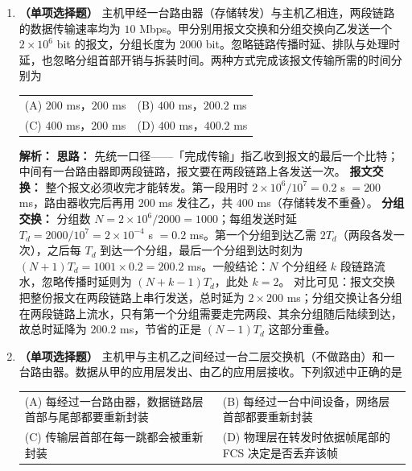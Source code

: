 \begin{enumerate}[start=7]

\item \textbf{（单项选择题）} 主机甲经一台路由器（存储转发）与主机乙相连，两段链路的数据传输速率均为 $10$ Mbps。甲分别用报文交换和分组交换向乙发送一个 $2\times10^{6}$ bit 的报文，分组长度为 $2000$ bit。忽略链路传播时延、排队与处理时延，也忽略分组首部开销与拆装时间。两种方式完成该报文传输所需的时间分别为
\begin{center}
\begin{tabular}{ll}
(A) $200$ ms，$200$ ms & (B) $400$ ms，$200.2$ ms \\[4pt]
(C) $400$ ms，$200$ ms & (D) $400$ ms，$400.2$ ms
\end{tabular}
\end{center}

\ifshowsolutions\par\noindent\textbf{解析：} \textbf{思路：} 先统一口径——「完成传输」指乙收到报文的最后一个比特；中间有一台路由器即两段链路，报文要在两段链路上各发送一次。
\textbf{报文交换：} 整个报文必须收完才能转发。第一段用时 $2\times10^{6}/10^{7}=0.2$ s $=200$ ms，路由器收完后再用 $200$ ms 发往乙，共 $400$ ms（存储转发不重叠）。
\textbf{分组交换：} 分组数 $N=2\times10^{6}/2000=1000$；每组发送时延 $T_d=2000/10^{7}=2\times10^{-4}$ s $=0.2$ ms。第一个分组到达乙需 $2T_d$（两段各发一次），之后每 $T_d$ 到达一个分组，最后一个分组到达时刻为 $(N+1)T_d=1001\times0.2=200.2$ ms。一般结论：$N$ 个分组经 $k$ 段链路流水，忽略传播时延则为 $(N+k-1)T_d$，此处 $k=2$。
对比可见：报文交换把整份报文在两段链路上串行发送，总时延为 $2\times200$ ms；分组交换让各分组在两段链路上流水，只有第一个分组需要走完两段、其余分组随后陆续到达，故总时延降为 $200.2$ ms，节省的正是 $(N-1)T_d$ 这部分重叠。\else \answerarea[6] \fi

\vspace{8pt}

\item \textbf{（单项选择题）} 主机甲与主机乙之间经过一台二层交换机（不做路由）和一台路由器。数据从甲的应用层发出、由乙的应用层接收。下列叙述中正确的是
\begin{center}
\begin{tabularx}{\linewidth}{@{}XX@{}}
(A) 每经过一台路由器，数据链路层首部与尾部都要重新封装 & (B) 每经过一台中间设备，网络层首部都要重新封装 \\[4pt]
(C) 传输层首部在每一跳都会被重新封装 & (D) 物理层在转发时依据帧尾部的 FCS 决定是否丢弃该帧
\end{tabularx}
\end{center}


\end{enumerate}
